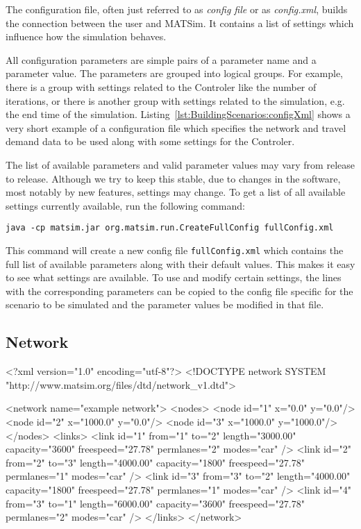 The configuration file, often just referred to as \emph{config file}
or as \emph{config.xml}, builds the connection between the user and MATSim.
It contains a list of settings which influence how the simulation behaves.

All configuration parameters are simple pairs of a parameter name and a
parameter value. The parameters are grouped into logical groups. For example,
there is a group with settings related to the Controler like the number of
iterations, or there is another group with settings related to the simulation,
e.g. the end time of the simulation.
Listing~\ref{lst:BuildingScenarios:configXml} shows a very short example of a
configuration file which specifies the network and travel demand data to be used
along with some settings for the Controler.

The list of available parameters and valid parameter values may vary from
release to release. Although we try to keep this stable, due to changes in the
software, most notably by new features, settings may change. To get a list of
all available settings currently available, run the following command:
\begin{lstlisting}
java -cp matsim.jar org.matsim.run.CreateFullConfig fullConfig.xml
\end{lstlisting}
This command will create a new config file {\tt fullConfig.xml} which contains
the full list of available parameters along with their default values. This
makes it easy to see what settings are available. To use and modify certain
settings, the lines with the corresponding parameters can be copied to the
config file specific for the scenario to be simulated and the parameter values
be modified in that file.


\subsection{Network}

\begin{xml-file}[caption=An example of a network.xml,
label=lst:BuildingScenarios:networkXml]
<?xml version="1.0" encoding="utf-8"?>
<!DOCTYPE network SYSTEM "http://www.matsim.org/files/dtd/network_v1.dtd">

<network name="example network">
	<nodes>
		<node id="1" x="0.0" y="0.0"/>
		<node id="2" x="1000.0" y="0.0"/>
		<node id="3" x="1000.0" y="1000.0"/>
	</nodes>
	<links>
		<link id="1" from="1" to="2" length="3000.00" capacity="3600" 
		                           freespeed="27.78" permlanes="2" modes="car" />
		<link id="2" from="2" to="3" length="4000.00" capacity="1800" 
		                           freespeed="27.78" permlanes="1" modes="car" />
		<link id="3" from="3" to="2" length="4000.00" capacity="1800" 
		                           freespeed="27.78" permlanes="1" modes="car" />
		<link id="4" from="3" to="1" length="6000.00" capacity="3600" 
		                           freespeed="27.78" permlanes="2" modes="car" />
	</links>
</network>
\end{xml-file}

